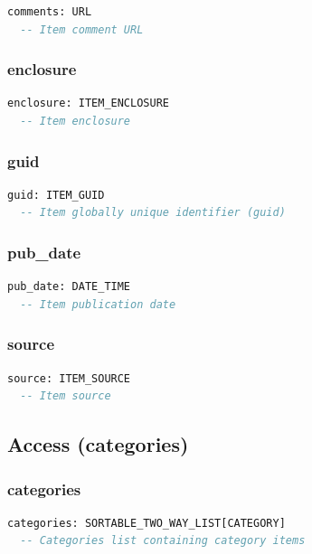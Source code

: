 \begin{lstlisting}[language=Eiffel]
comments: URL
  -- Item comment URL
\end{lstlisting}

\subsubsection{enclosure}

\begin{lstlisting}[language=Eiffel]
enclosure: ITEM_ENCLOSURE
  -- Item enclosure
\end{lstlisting}

\subsubsection{guid}

\begin{lstlisting}[language=Eiffel]
guid: ITEM_GUID
  -- Item globally unique identifier (guid)
\end{lstlisting}

\subsubsection{pub\_date}

\begin{lstlisting}[language=Eiffel]
pub_date: DATE_TIME
  -- Item publication date
\end{lstlisting}

\subsubsection{source}

\begin{lstlisting}[language=Eiffel]
source: ITEM_SOURCE
  -- Item source
\end{lstlisting}


\subsection{Access (categories)}
\label{sec:item-access-categories}

\subsubsection{categories}

\begin{lstlisting}[language=Eiffel]
categories: SORTABLE_TWO_WAY_LIST[CATEGORY]
  -- Categories list containing category items
\end{lstlisting}

